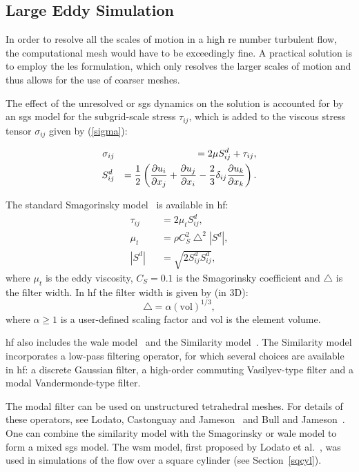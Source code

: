 \subsection{Large Eddy Simulation}\label{lesmodels}

In order to resolve all the scales of motion in a high \gls{re} number turbulent flow, the computational mesh would have to be exceedingly fine.
A practical solution is to employ the \gls{les} formulation, which only resolves the larger scales of motion and thus allows for the use of coarser meshes.

The effect of the unresolved or \gls{sgs} dynamics on the solution is accounted for by an \gls{sgs} model for the subgrid-scale stress $\tau_{ij}$, which is added to the viscous stress tensor $\sigma_{ij}$ given by (\ref{sigma}):

\begin{eqnarray}\label{tausgs}
\sigma_{ij} &&= 2 \mu S^d_{ij} + \tau_{ij},\\
S^d_{ij} &&= \frac 1 2 \left( \frac{\partial u_i}{\partial x_j} + \frac{\partial u_j}{\partial x_i} - \frac{2}{3} \delta_{ij}\frac{\partial u_k}{\partial x_k} \right).
\end{eqnarray}

The standard Smagorinsky model~\cite{smagorinsky1963} is available in \gls{hf}:
\begin{eqnarray}\label{smag}
\tau_{ij} &&= 2 \mu_t S^d_{ij}, \\
\mu_t &&= \rho C_S^2 \bigtriangleup^2 | S^d |,\\
| S^d | &&= \sqrt{2 S^d_{ij} S^d_{ij}},
\end{eqnarray}
where $\mu_t$ is the eddy viscosity, $C_S = 0.1$ is the Smagorinsky coefficient and $\bigtriangleup$ is the filter width. In \gls{hf} the filter width is given by (in 3D):
\begin{equation}
\bigtriangleup = \alpha (\text{vol})^{1/3},
\end{equation}
where $\alpha \geq 1$ is a user-defined scaling factor and vol is the element volume.

\gls{hf} also includes the \gls{wale} model~\cite{nicoud1999} and the Similarity model~\cite{bardina1980}.
The Similarity model incorporates a low-pass filtering operator, for which several choices are available in \gls{hf}: a discrete Gaussian filter\cite{lodato2012b}, a high-order commuting Vasilyev-type filter\cite{vasilyev1998,vasilyev2001} and a modal Vandermonde-type filter\cite{blackburn2003}.

The modal filter can be used on unstructured tetrahedral meshes. For details of these operators, see Lodato, Castonguay and Jameson~\cite{lodato2012b} and Bull and Jameson~\cite{bull2014a}. One can combine the similarity model with the Smagorinsky or \gls{wale} model to form a mixed \gls{sgs} model. The \gls{wsm} model, first proposed by Lodato et al.~\cite{lodato2009}, was used in simulations of the flow over a square cylinder (see Section~\ref{sqcyl}).

